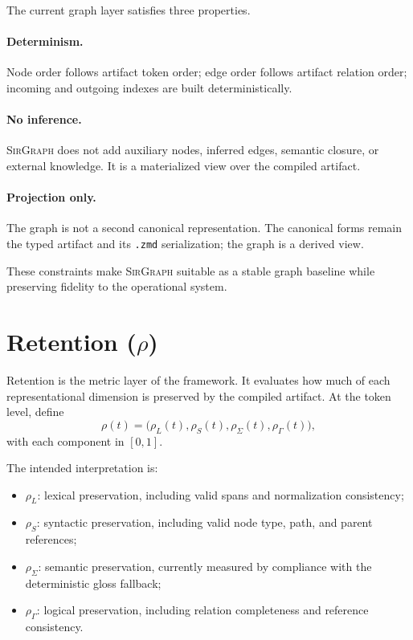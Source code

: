\documentclass{article}
\newcommand{\SirGraphName}{{\normalfont\textsc{SirGraph}}}
\begin{document}
The current graph layer satisfies three properties.

\paragraph{Determinism.}
Node order follows artifact token order; edge order follows artifact relation order; incoming and outgoing indexes are built deterministically.

\paragraph{No inference.}
\SirGraphName{} does not add auxiliary nodes, inferred edges, semantic closure, or external knowledge. It is a materialized view over the compiled artifact.

\paragraph{Projection only.}
The graph is not a second canonical representation. The canonical forms remain the typed artifact and its \texttt{.zmd} serialization; the graph is a derived view.

These constraints make \SirGraphName{} suitable as a stable graph baseline while preserving fidelity to the operational system.

\section{Retention \texorpdfstring{(\(\rho\))}{(rho)}}

Retention is the metric layer of the framework. It evaluates how much of each representational dimension is preserved by the compiled artifact. At the token level, define
\[
\rho(t) = \bigl(\rho_L(t), \rho_S(t), \rho_\Sigma(t), \rho_\Gamma(t)\bigr),
\]
with each component in \([0,1]\).

The intended interpretation is:
\begin{itemize}
\item \(\rho_L\): lexical preservation, including valid spans and normalization consistency;
\item \(\rho_S\): syntactic preservation, including valid node type, path, and parent references;
\item \(\rho_\Sigma\): semantic preservation, currently measured by compliance with the deterministic gloss fallback;
\item \(\rho_\Gamma\): logical preservation, including relation completeness and reference consistency.
\end{itemize}
\end{document}
